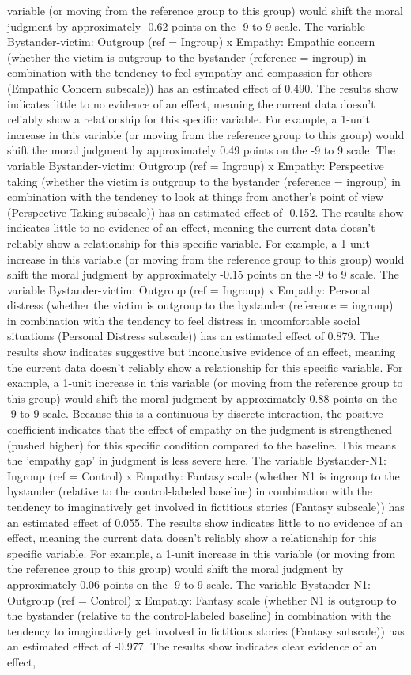 \documentclass[11pt]{article}
\begin{document}
variable (or moving from the reference group to this group) would shift the moral judgment by approximately -0.62 points on the -9 to 9 scale. The variable Bystander-victim: Outgroup (ref = Ingroup) x Empathy: Empathic concern (whether the victim is outgroup to the bystander (reference = ingroup) in combination with the tendency to feel sympathy and compassion for others (Empathic Concern subscale)) has an estimated effect of 0.490. The results show indicates little to no evidence of an effect, meaning the current data doesn't reliably show a relationship for this specific variable. For example, a 1-unit increase in this variable (or moving from the reference group to this group) would shift the moral judgment by approximately 0.49 points on the -9 to 9 scale. The variable Bystander-victim: Outgroup (ref = Ingroup) x Empathy: Perspective taking (whether the victim is outgroup to the bystander (reference = ingroup) in combination with the tendency to look at things from another's point of view (Perspective Taking subscale)) has an estimated effect of -0.152. The results show indicates little to no evidence of an effect, meaning the current data doesn't reliably show a relationship for this specific variable. For example, a 1-unit increase in this variable (or moving from the reference group to this group) would shift the moral judgment by approximately -0.15 points on the -9 to 9 scale. The variable Bystander-victim: Outgroup (ref = Ingroup) x Empathy: Personal distress (whether the victim is outgroup to the bystander (reference = ingroup) in combination with the tendency to feel distress in uncomfortable social situations (Personal Distress subscale)) has an estimated effect of 0.879. The results show indicates suggestive but inconclusive evidence of an effect, meaning the current data doesn't reliably show a relationship for this specific variable. For example, a 1-unit increase in this variable (or moving from the reference group to this group) would shift the moral judgment by approximately 0.88 points on the -9 to 9 scale. Because this is a continuous-by-discrete interaction, the positive coefficient indicates that the effect of empathy on the judgment is strengthened (pushed higher) for this specific condition compared to the baseline. This means the 'empathy gap' in judgment is less severe here. The variable Bystander-N1: Ingroup (ref = Control) x Empathy: Fantasy scale (whether N1 is ingroup to the bystander (relative to the control-labeled baseline) in combination with the tendency to imaginatively get involved in fictitious stories (Fantasy subscale)) has an estimated effect of 0.055. The results show indicates little to no evidence of an effect, meaning the current data doesn't reliably show a relationship for this specific variable. For example, a 1-unit increase in this variable (or moving from the reference group to this group) would shift the moral judgment by approximately 0.06 points on the -9 to 9 scale. The variable Bystander-N1: Outgroup (ref = Control) x Empathy: Fantasy scale (whether N1 is outgroup to the bystander (relative to the control-labeled baseline) in combination with the tendency to imaginatively get involved in fictitious stories (Fantasy subscale)) has an estimated effect of -0.977. The results show indicates clear evidence of an effect, 
\end{document}
